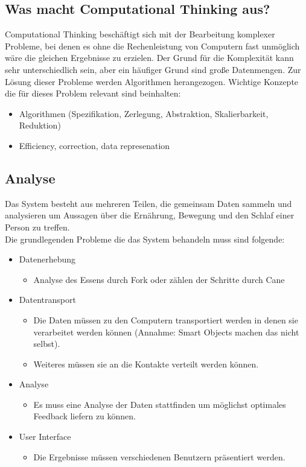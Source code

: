 
\subsection{Was macht Computational Thinking aus?}
Computational Thinking beschäftigt sich mit der Bearbeitung komplexer Probleme, bei denen es ohne die Rechenleistung von Computern fast unmöglich wäre die gleichen Ergebnisse zu erzielen. Der Grund für die Komplexität kann sehr unterschiedlich sein, aber ein häufiger Grund sind große Datenmengen. Zur Lösung dieser Probleme werden Algorithmen herangezogen. Wichtige Konzepte die für dieses Problem relevant sind beinhalten:\cite{slidesComp}
\begin{itemize}
	\item Algorithmen (Spezifikation, Zerlegung, Abstraktion, Skalierbarkeit, Reduktion)\cite{slidesComp}
	\item Efficiency, correction, data represenation\cite{thinkingAboutCompThinking}
\end{itemize}

\subsection{Analyse}
Das System besteht aus mehreren Teilen, die gemeinsam Daten sammeln und analysieren um Aussagen über die Ernährung, Bewegung und den Schlaf einer Person zu treffen. \\

Die grundlegenden Probleme die das System behandeln muss sind folgende: 
\begin{itemize}
	\item Datenerhebung 
	\begin{itemize}
		\item Analyse des Essens durch Fork oder zählen der Schritte durch Cane 
	\end{itemize}

	\item Datentransport 
	\begin{itemize}
		\item Die Daten müssen zu den Computern transportiert werden in denen sie verarbeitet werden können (Annahme: Smart Objects machen das nicht selbst). 
		\item Weiteres müssen sie an die Kontakte verteilt werden können. 
	\end{itemize}  

	\item Analyse
	\begin{itemize}
		\item Es muss eine Analyse der Daten stattfinden um möglichst optimales Feedback liefern zu können. 
	\end{itemize}  

	\item User Interface 
	\begin{itemize}
			\item Die Ergebnisse müssen verschiedenen Benutzern präsentiert werden. 
	\end{itemize}
\end{itemize}

